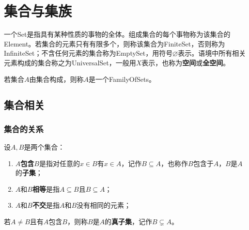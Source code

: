 \section{集合与集族}
\begin{definition}
	一个\gls{Set}是指具有某种性质的事物的全体。组成集合的每个事物称为该集合的\gls{Element}。若集合的元素只有有限多个，则称该集合为\gls{FiniteSet}，否则称为\gls{InfiniteSet}；不含任何元素的集合称为\gls{EmptySet}，用符号$\varnothing$表示。语境中所有相关元素构成的集合称之为\gls{UniversalSet}，一般用$X$表示，也称为\textbf{空间}或\textbf{全空间}。
\end{definition}
\begin{definition}
	若集合$A$由集合构成，则称$A$是一个\gls{FamilyOfSets}。
\end{definition}

\subsection{集合相关}
\subsubsection{集合的关系}
\begin{definition}
	设$A,B$是两个集合：
	\begin{enumerate}
		\item $A$\textbf{包含}$B$是指对任意的$x\in B$有$x\in A$，记作$B\subseteq A$，也称作$B$包含于$A$，$B$是$A$的\textbf{子集}；
		\item $A$和$B$\textbf{相等}是指$A\subseteq B$且$B\subseteq A$；
		\item $A$和$B$\textbf{不交}是指$A$和$B$没有相同的元素；
	\end{enumerate}
	若$A\ne B$且有$A$包含$B$，则称$B$是$A$的\textbf{真子集}，记作$B\subsetneq A$。
\end{definition}
